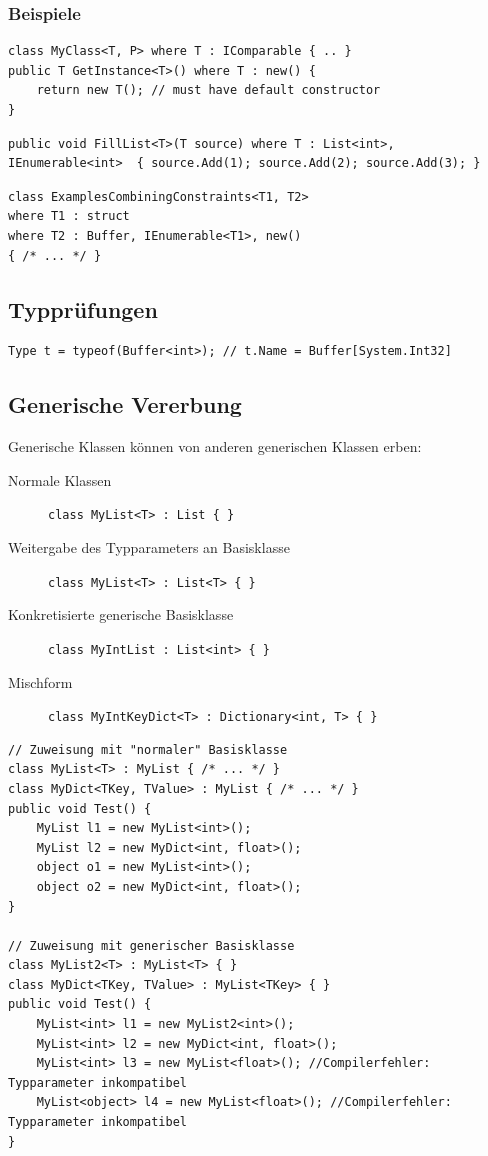 \documentclass[
a4paper,
oneside,
10pt,
fleqn,
headsepline,
toc=listofnumbered, 
bibliography=totocnumbered]{scrartcl}
\begin{document}
\subsubsection{Beispiele}
\begin{lstlisting}
class MyClass<T, P> where T : IComparable { .. }
public T GetInstance<T>() where T : new() {
	return new T(); // must have default constructor
}
\end{lstlisting}

\begin{lstlisting}
public void FillList<T>(T source) where T : List<int>, IEnumerable<int>  { source.Add(1); source.Add(2); source.Add(3); }
\end{lstlisting}


\begin{lstlisting}
class ExamplesCombiningConstraints<T1, T2>
where T1 : struct 
where T2 : Buffer, IEnumerable<T1>, new()
{ /* ... */ } 
\end{lstlisting}

\subsection{Typprüfungen}
\begin{lstlisting}
Type t = typeof(Buffer<int>); // t.Name = Buffer[System.Int32]
\end{lstlisting}

\subsection{Generische Vererbung}
Generische Klassen können von anderen generischen Klassen erben:
\begin{description}
	\item[Normale Klassen] \lstinline|class MyList<T> : List { } |
	\item[Weitergabe des Typparameters an Basisklasse] \lstinline|class MyList<T> : List<T> { } |
	\item [Konkretisierte generische Basisklasse] \lstinline|class MyIntList : List<int> { } |
	\item[Mischform] \lstinline|class MyIntKeyDict<T> : Dictionary<int, T> { } |
\end{description}
\begin{lstlisting}
// Zuweisung mit "normaler" Basisklasse
class MyList<T> : MyList { /* ... */ } 
class MyDict<TKey, TValue> : MyList { /* ... */ } 
public void Test() {
    MyList l1 = new MyList<int>();
    MyList l2 = new MyDict<int, float>();
    object o1 = new MyList<int>();
    object o2 = new MyDict<int, float>(); 
} 

// Zuweisung mit generischer Basisklasse
class MyList2<T> : MyList<T> { } 
class MyDict<TKey, TValue> : MyList<TKey> { }
public void Test() { 
    MyList<int> l1 = new MyList2<int>();
    MyList<int> l2 = new MyDict<int, float>();
    MyList<int> l3 = new MyList<float>(); //Compilerfehler: Typparameter inkompatibel
    MyList<object> l4 = new MyList<float>(); //Compilerfehler: Typparameter inkompatibel
}
\end{lstlisting}
\end{document}
